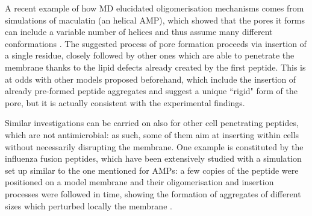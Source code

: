 A recent example of how MD elucidated oligomerisation mechanisms comes from simulations of maculatin (an helical AMP), which showed that the pores it forms can include a variable number of helices and thus assume many different conformations \cite{Wang2016}. The suggested process of pore formation proceeds via insertion of a single residue, closely followed by other ones which are able to penetrate the membrane thanks to the lipid defects already created by the first peptide. This is at odds with other models proposed beforehand, which include the insertion of already pre-formed peptide aggregates and suggest a unique ``rigid" form of the pore, but it is actually consistent with the experimental findings.

Similar investigations can be carried on also for other cell penetrating peptides, which are not antimicrobial: as such, some of them aim at inserting within cells without necessarily disrupting the membrane. One example is constituted by the influenza fusion peptides, which have been extensively studied with a simulation set up similar to the one mentioned for AMPs: a few copies of the peptide were positioned on a model membrane and their oligomerisation and insertion processes were followed in time, showing the formation of aggregates of different sizes which perturbed locally the membrane \cite{Haria2014,Collu2015}.

